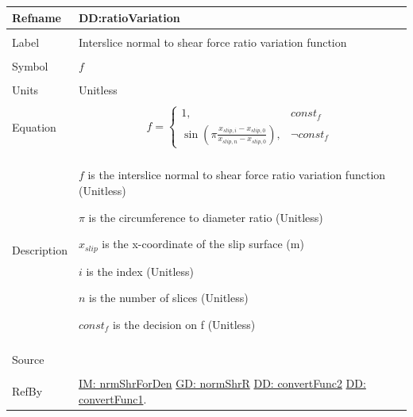 \documentclass[12pt]{article}
\begin{document}
\noindent \begin{minipage}{\textwidth}
\begin{tabular}{p{} p{}}
\toprule \textbf{Refname} & \textbf{DD:ratioVariation}
\label{DD:ratioVariation}
\\ \midrule \\
Label & Interslice normal to shear force ratio variation function
        \\ \midrule \\
        Symbol & $f$
                 \\ \midrule \\
                 Units & Unitless
                         \\ \midrule \\
                         Equation & \begin{displaymath}
                                    f=\begin{cases}
1, & const_f\\
\sin\left(π \frac{{x_{slip,i}}-{x_{slip,0}}}{{x_{slip,n}}-{x_{slip,0}}}\right), & \neg{}const_f
\end{cases}
                                    \end{displaymath}
                                    \\ \midrule \\
                                    Description & \begin{symbDescription}
                                                  \item{$f$ is the interslice normal to shear force ratio variation function (Unitless)}
                                                  \item{$π$ is the circumference to diameter ratio (Unitless)}
                                                  \item{${x_{slip}}$ is the x-coordinate of the slip surface (m)}
                                                  \item{$i$ is the index (Unitless)}
                                                  \item{$n$ is the number of slices (Unitless)}
                                                  \item{$const_f$ is the decision on f (Unitless)}
                                                  \end{symbDescription}
                                                  \\ \midrule \\
                                                  Source & \cite{fredlund1977}
                                                           \\ \midrule \\
                                                           RefBy & \hyperref[IM:nrmShrForDen]{IM: nrmShrForDen} \hyperref[GD:normShrR]{GD: normShrR} \hyperref[DD:convertFunc2]{DD: convertFunc2} \hyperref[DD:convertFunc1]{DD: convertFunc1}.
\\ \bottomrule \end{tabular}
\end{minipage}
\end{document}
